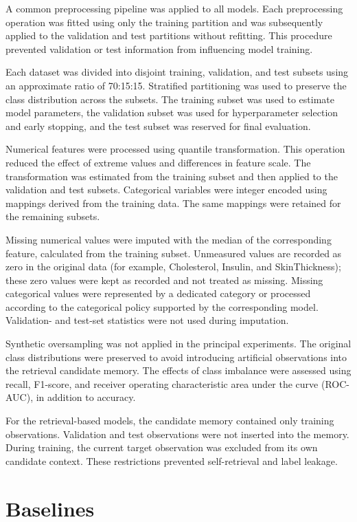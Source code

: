\documentclass[11pt,a4paper,oneside, openany, reqno, chapter, nokorean]{oblivoir}
\theoremstyle{definition}
\theoremstyle{remark}
\numberwithin{equation}{chapter}
\theoremstyle{definition}
\theoremstyle{remark}
\theoremstyle{definition}
\begin{document}
A common preprocessing pipeline was applied to all models. Each preprocessing operation was fitted using only the training partition and was subsequently applied to the validation and test partitions without refitting. This procedure prevented validation or test information from influencing model training.

Each dataset was divided into disjoint training, validation, and test subsets using an approximate ratio of 70:15:15. Stratified partitioning was used to preserve the class distribution across the subsets. The training subset was used to estimate model parameters, the validation subset was used for hyperparameter selection and early stopping, and the test subset was reserved for final evaluation.

Numerical features were processed using quantile transformation. This operation reduced the effect of extreme values and differences in feature scale. The transformation was estimated from the training subset and then applied to the validation and test subsets. Categorical variables were integer encoded using mappings derived from the training data. The same mappings were retained for the remaining subsets.

Missing numerical values were imputed with the median of the corresponding feature, calculated from the training subset. Unmeasured values are recorded as zero in the original data (for example, Cholesterol, Insulin, and SkinThickness); these zero values were kept as recorded and not treated as missing. Missing categorical values were represented by a dedicated category or processed according to the categorical policy supported by the corresponding model. Validation- and test-set statistics were not used during imputation.

Synthetic oversampling was not applied in the principal experiments. The original class distributions were preserved to avoid introducing artificial observations into the retrieval candidate memory. The effects of class imbalance were assessed using recall, F1-score, and receiver operating characteristic area under the curve (ROC-AUC), in addition to accuracy.

For the retrieval-based models, the candidate memory contained only training observations. Validation and test observations were not inserted into the memory. During training, the current target observation was excluded from its own candidate context. These restrictions prevented self-retrieval and label leakage.

\section{Baselines}
\label{sec:baselines}
\end{document}
